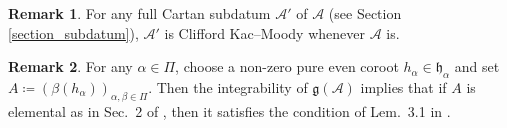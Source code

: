 \documentclass[12pt, a4paper, reqno]{amsart}
\def\AA{\mathcal{A}}
\def\h{\mathfrak{h}}
\theoremstyle{definition}
\theoremstyle{definition}
\newtheorem{remark}{Remark}
\theoremstyle{definition}
\numberwithin{theorem}{section}
\numberwithin{lemma}{section}
\numberwithin{remark}{section}
\numberwithin{definition}{section}
\numberwithin{corollary}{section}
\numberwithin{proposition}{section}
\numberwithin{example}{section}
\begin{document}
	\begin{remark}\label{remark-almostKM-subdatum}
		For any full Cartan subdatum $\AA'$ of $\AA$ (see Section \ref{section_subdatum}), $\AA'$ is Clifford Kac--Moody whenever $\AA$ is.
	\end{remark}
	
		

	\begin{remark}
		For any \(\alpha \in \Pi\), choose a non-zero pure even coroot \(h_{\alpha}\in\h_{\alpha}\) and set \(A \coloneq (\beta(h_{\alpha}))_{\alpha,\beta\in\Pi}\). Then the integrability of \(\mathfrak{g}(\mathcal{A})\) implies that if \(A\) is elemental as in Sec.~2 of \cite{CS}, then it satisfies the condition of Lem.~3.1 in \cite{CS}. 
	\end{remark}
	
\end{document}
